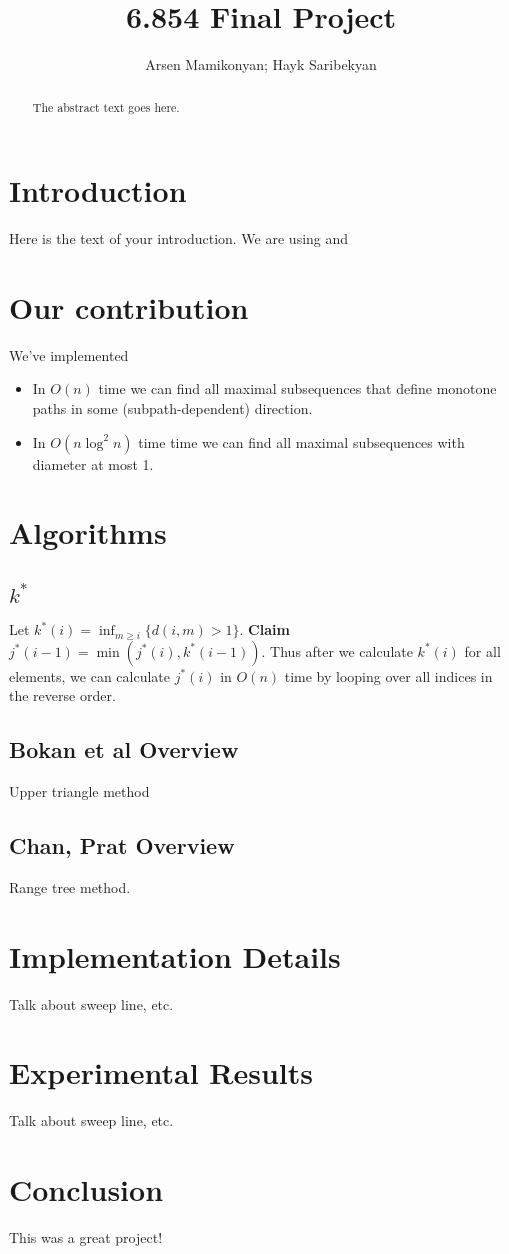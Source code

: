 \documentclass{article}
\begin{document}
\title{6.854 Final Project}
\author{Arsen Mamikonyan; Hayk Saribekyan}


\maketitle

\begin{abstract}
The abstract text goes here.
\end{abstract}

\section{Introduction}
Here is the text of your introduction.
We are using \cite{bokal_et_al:LIPIcs:2015:5113} and \cite{chan_et_al:LIPIcs:2016:5920}

\section{Our contribution}
We've implemented
\begin{itemize}
\item In $O(n)$ time  we  can  find  all  maximal  subsequences  that  define  monotone  paths  in  some (subpath-dependent) direction. \cite{bokal_et_al:LIPIcs:2015:5113} 
\item In $O(n \log^2 n)$ time time we can find all maximal subsequences with diameter at most 1. \cite{chan_et_al:LIPIcs:2016:5920}
\end{itemize}

\section{Algorithms}
\subsection{$k^*$}

Let $k^*(i) = \inf_{m \geq i} \{d(i, m) > 1\}$. \textbf{Claim} $j^*(i-1) = \min(j^*(i), k^*(i-1))$. Thus after we calculate $k^*(i)$ for all elements, we can calculate $j^*(i)$ in $O(n)$ time by looping over all indices in the reverse order.

\subsection{Bokan et al Overview}
Upper triangle method

\subsection{Chan, Prat Overview}
Range tree method.

\section{Implementation Details}
Talk about sweep line, etc.

\section{Experimental Results}
Talk about sweep line, etc.

\section{Conclusion}
This was a great project!



\end{document}
